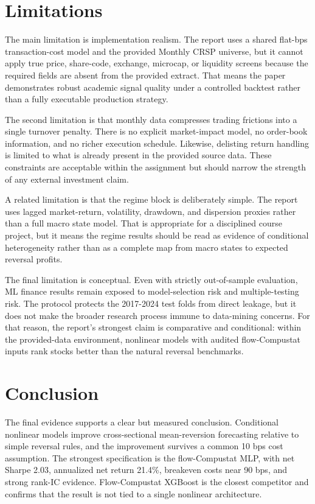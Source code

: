 \section{Limitations}

The main limitation is implementation realism. The report uses a shared
flat-bps transaction-cost model and the provided Monthly CRSP universe, but it
cannot apply true price, share-code, exchange, microcap, or liquidity screens
because the required fields are absent from the provided extract. That means
the paper demonstrates robust academic signal quality under a controlled
backtest rather than a fully executable production strategy.

The second limitation is that monthly data compresses trading frictions into a
single turnover penalty. There is no explicit market-impact model, no
order-book information, and no richer execution schedule. Likewise, delisting
return handling is limited to what is already present in the provided source
data. These constraints are acceptable within the assignment but should narrow
the strength of any external investment claim.

A related limitation is that the regime block is deliberately simple. The
report uses lagged market-return, volatility, drawdown, and dispersion proxies
rather than a full macro state model. That is appropriate for a disciplined
course project, but it means the regime results should be read as evidence of
conditional heterogeneity rather than as a complete map from macro states to
expected reversal profits.

The final limitation is conceptual. Even with strictly out-of-sample
evaluation, ML finance results remain exposed to model-selection risk and
multiple-testing risk. The protocol protects the 2017-2024 test folds from
direct leakage, but
it does not make the broader research process immune to data-mining concerns.
For that reason, the report's strongest claim is comparative and conditional:
within the provided-data environment, nonlinear models with audited
flow-Compustat inputs rank stocks better than the natural reversal
benchmarks.

\section{Conclusion}

The final evidence supports a clear but measured conclusion. Conditional
nonlinear models improve cross-sectional mean-reversion forecasting relative to
simple reversal rules, and the improvement survives a common 10 bps cost
assumption. The strongest specification is the flow-Compustat MLP,
with net Sharpe 2.03, annualized net return 21.4\%, breakeven costs near 90
bps, and strong rank-IC evidence. Flow-Compustat XGBoost is the closest
competitor and confirms that the result is not tied to a single nonlinear
architecture.

